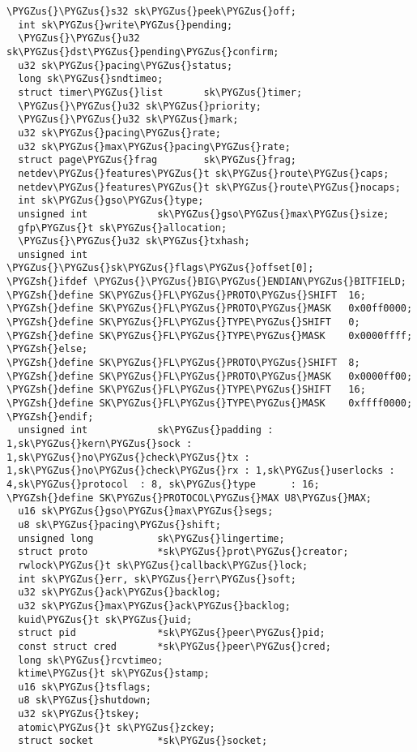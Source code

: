 \documentclass[a4paper,8pt,english]{sphinxmanual}
\def\PYGZus{\char`\_}
\def\PYGZsh{\char`\#}
\begin{document}
\begin{Verbatim}[commandchars=\\\{\}]
  \PYGZus{}\PYGZus{}s32 sk\PYGZus{}peek\PYGZus{}off;
  int sk\PYGZus{}write\PYGZus{}pending;
  \PYGZus{}\PYGZus{}u32 sk\PYGZus{}dst\PYGZus{}pending\PYGZus{}confirm;
  u32 sk\PYGZus{}pacing\PYGZus{}status;
  long sk\PYGZus{}sndtimeo;
  struct timer\PYGZus{}list       sk\PYGZus{}timer;
  \PYGZus{}\PYGZus{}u32 sk\PYGZus{}priority;
  \PYGZus{}\PYGZus{}u32 sk\PYGZus{}mark;
  u32 sk\PYGZus{}pacing\PYGZus{}rate;
  u32 sk\PYGZus{}max\PYGZus{}pacing\PYGZus{}rate;
  struct page\PYGZus{}frag        sk\PYGZus{}frag;
  netdev\PYGZus{}features\PYGZus{}t sk\PYGZus{}route\PYGZus{}caps;
  netdev\PYGZus{}features\PYGZus{}t sk\PYGZus{}route\PYGZus{}nocaps;
  int sk\PYGZus{}gso\PYGZus{}type;
  unsigned int            sk\PYGZus{}gso\PYGZus{}max\PYGZus{}size;
  gfp\PYGZus{}t sk\PYGZus{}allocation;
  \PYGZus{}\PYGZus{}u32 sk\PYGZus{}txhash;
  unsigned int            \PYGZus{}\PYGZus{}sk\PYGZus{}flags\PYGZus{}offset[0];
\PYGZsh{}ifdef \PYGZus{}\PYGZus{}BIG\PYGZus{}ENDIAN\PYGZus{}BITFIELD;
\PYGZsh{}define SK\PYGZus{}FL\PYGZus{}PROTO\PYGZus{}SHIFT  16;
\PYGZsh{}define SK\PYGZus{}FL\PYGZus{}PROTO\PYGZus{}MASK   0x00ff0000;
\PYGZsh{}define SK\PYGZus{}FL\PYGZus{}TYPE\PYGZus{}SHIFT   0;
\PYGZsh{}define SK\PYGZus{}FL\PYGZus{}TYPE\PYGZus{}MASK    0x0000ffff;
\PYGZsh{}else;
\PYGZsh{}define SK\PYGZus{}FL\PYGZus{}PROTO\PYGZus{}SHIFT  8;
\PYGZsh{}define SK\PYGZus{}FL\PYGZus{}PROTO\PYGZus{}MASK   0x0000ff00;
\PYGZsh{}define SK\PYGZus{}FL\PYGZus{}TYPE\PYGZus{}SHIFT   16;
\PYGZsh{}define SK\PYGZus{}FL\PYGZus{}TYPE\PYGZus{}MASK    0xffff0000;
\PYGZsh{}endif;
  unsigned int            sk\PYGZus{}padding : 1,sk\PYGZus{}kern\PYGZus{}sock : 1,sk\PYGZus{}no\PYGZus{}check\PYGZus{}tx : 1,sk\PYGZus{}no\PYGZus{}check\PYGZus{}rx : 1,sk\PYGZus{}userlocks : 4,sk\PYGZus{}protocol  : 8, sk\PYGZus{}type      : 16;
\PYGZsh{}define SK\PYGZus{}PROTOCOL\PYGZus{}MAX U8\PYGZus{}MAX;
  u16 sk\PYGZus{}gso\PYGZus{}max\PYGZus{}segs;
  u8 sk\PYGZus{}pacing\PYGZus{}shift;
  unsigned long           sk\PYGZus{}lingertime;
  struct proto            *sk\PYGZus{}prot\PYGZus{}creator;
  rwlock\PYGZus{}t sk\PYGZus{}callback\PYGZus{}lock;
  int sk\PYGZus{}err, sk\PYGZus{}err\PYGZus{}soft;
  u32 sk\PYGZus{}ack\PYGZus{}backlog;
  u32 sk\PYGZus{}max\PYGZus{}ack\PYGZus{}backlog;
  kuid\PYGZus{}t sk\PYGZus{}uid;
  struct pid              *sk\PYGZus{}peer\PYGZus{}pid;
  const struct cred       *sk\PYGZus{}peer\PYGZus{}cred;
  long sk\PYGZus{}rcvtimeo;
  ktime\PYGZus{}t sk\PYGZus{}stamp;
  u16 sk\PYGZus{}tsflags;
  u8 sk\PYGZus{}shutdown;
  u32 sk\PYGZus{}tskey;
  atomic\PYGZus{}t sk\PYGZus{}zckey;
  struct socket           *sk\PYGZus{}socket;

\end{Verbatim}
\end{document}
